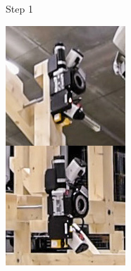 \begin{figure}[!h]
\begin{subfigure}[b]{0.24\textwidth}
        \caption*{Step 1}%
    \end{subfigure}
    \hfill
    \begin{subfigure}[b]{0.24\textwidth}
        \centering
        \includegraphics[width=\textwidth]{images/7b/img87.jpg}

\end{subfigure}
\end{figure}
